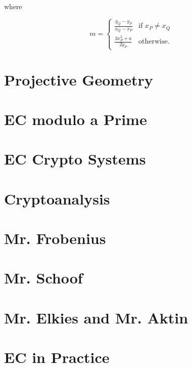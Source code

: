 \documentclass[tikz]{scrreprt}
\begin{document}
where

\begin{equation}
m = \begin{cases}
      \frac{y_Q - y_P}{x_Q - x_P} & \textrm{if  $x_P \neq x_Q$}\\[10pt]
      \frac{3x_P^2 + a}{2y_P}     & \textrm{otherwise}.
    \end{cases}
\end{equation}
\section{Projective Geometry} 
\section{EC modulo a Prime} 
\section{EC Crypto Systems} 
\section{Cryptoanalysis} 
\section{Mr. Frobenius} 
\section{Mr. Schoof} 
\section{Mr. Elkies and Mr. Aktin} 
\section{EC in Practice} 
\end{document}
